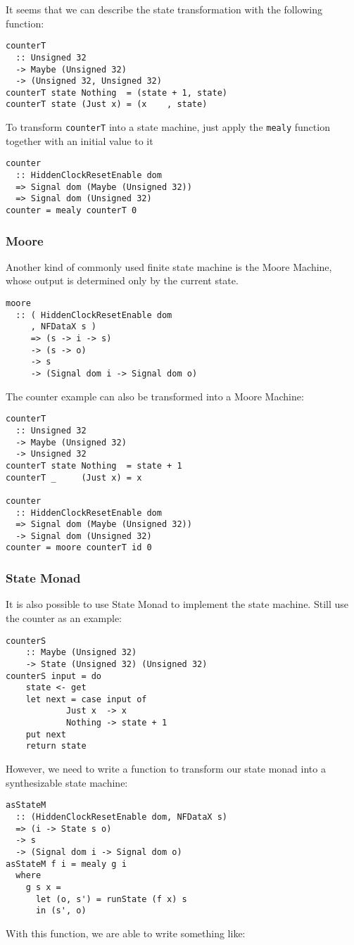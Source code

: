 It seems that we can describe the state transformation with the following function:
\begin{verbatim}
counterT 
  :: Unsigned 32 
  -> Maybe (Unsigned 32) 
  -> (Unsigned 32, Unsigned 32)
counterT state Nothing  = (state + 1, state)
counterT state (Just x) = (x    , state)
\end{verbatim}
To transform \texttt{counterT} into a state machine, just apply the \texttt{mealy} function together with an initial value to it
\begin{verbatim}
counter 
  :: HiddenClockResetEnable dom
  => Signal dom (Maybe (Unsigned 32))
  => Signal dom (Unsigned 32)
counter = mealy counterT 0
\end{verbatim}
\subsubsection{Moore}
Another kind of commonly used finite state machine is the Moore Machine, whose output is determined only by the current state.
\begin{verbatim}
moore
  :: ( HiddenClockResetEnable dom
     , NFDataX s )
     => (s -> i -> s)
     -> (s -> o)
     -> s
     -> (Signal dom i -> Signal dom o)
\end{verbatim}
The counter example can also be transformed into a Moore Machine:
\begin{verbatim}
counterT 
  :: Unsigned 32 
  -> Maybe (Unsigned 32) 
  -> Unsigned 32
counterT state Nothing  = state + 1
counterT _     (Just x) = x

counter 
  :: HiddenClockResetEnable dom
  => Signal dom (Maybe (Unsigned 32))
  -> Signal dom (Unsigned 32)
counter = moore counterT id 0
\end{verbatim}
\subsubsection{State Monad}
It is also possible to use State Monad to implement the state machine.
Still use the counter as an example:
\begin{verbatim}
counterS 
    :: Maybe (Unsigned 32)
    -> State (Unsigned 32) (Unsigned 32)
counterS input = do
    state <- get
    let next = case input of
            Just x  -> x
            Nothing -> state + 1
    put next
    return state
\end{verbatim}
However, we need to write a function to transform our state monad into a synthesizable state machine:
\begin{verbatim}
asStateM 
  :: (HiddenClockResetEnable dom, NFDataX s)
  => (i -> State s o)
  -> s
  -> (Signal dom i -> Signal dom o)
asStateM f i = mealy g i
  where
    g s x =
      let (o, s') = runState (f x) s
      in (s', o)
\end{verbatim}
With this function, we are able to write something like: 
